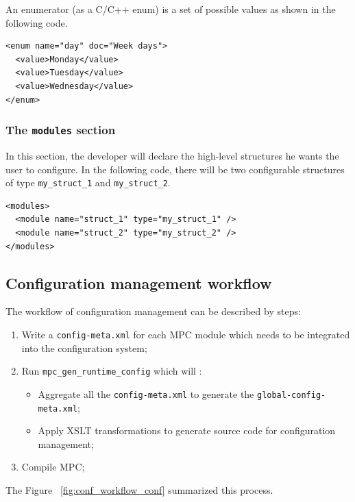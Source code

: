 \documentclass{article}
\begin{document}
\noindent An enumerator (as a C/C++ enum) is a set of possible values as shown in the following code.

\lstset{language=XML}
\begin{lstlisting}[title=Example of a \texttt{enum} definition]
<enum name="day" doc="Week days">
  <value>Monday</value>
  <value>Tuesday</value>
  <value>Wednesday</value>
</enum>
\end{lstlisting}

\subsubsection{The \texttt{modules} section}

In this section, the developer will declare the high-level structures he wants the user to configure. In the following code, there will be two configurable structures of type \texttt{my\_struct\_1} and
\texttt{my\_struct\_2}.

\lstset{language=XML}
\begin{lstlisting}[title=Example of a \texttt{modules} definition]
<modules>
  <module name="struct_1" type="my_struct_1" />
  <module name="struct_2" type="my_struct_2" />
</modules>
\end{lstlisting}

\subsection{Configuration management workflow}

The workflow of configuration management can be described by steps:
\begin{enumerate}
\item Write a \texttt{config-meta.xml} for each MPC module which needs to be integrated into the configuration system;
\item Run \texttt{mpc\_gen\_runtime\_config} which will :
\begin{itemize}
\item Aggregate all the \texttt{config-meta.xml} to generate the \texttt{global-config-meta.xml};
\item Apply XSLT transformations to generate source code for configuration management;
\end{itemize}
\item Compile MPC;
\end{enumerate}

\noindent The Figure ~\ref{fig:conf_workflow_conf} summarized this process.
\end{document}
